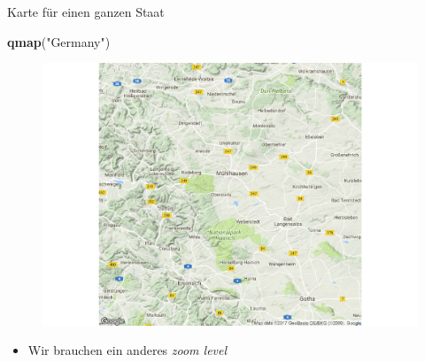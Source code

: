 \documentclass[ignorenonframetext,]{beamer}
\newenvironment{Shaded}{}{}
\newcommand{\KeywordTok}[1]{\textcolor[rgb]{0.00,0.44,0.13}{\textbf{{#1}}}}
\newcommand{\StringTok}[1]{\textcolor[rgb]{0.25,0.44,0.63}{{#1}}}
\newcommand{\NormalTok}[1]{{#1}}
\providecommand{\tightlist}{%
\setlength{\itemsep}{0pt}\setlength{\parskip}{0pt}}
\begin{document}
\begin{frame}[fragile]{Karte für einen ganzen Staat}

\begin{Shaded}
\begin{Highlighting}[]
\KeywordTok{qmap}\NormalTok{(}\StringTok{"Germany"}\NormalTok{)}
\end{Highlighting}
\end{Shaded}

\begin{figure}[htbp]
\centering
\includegraphics{RSocialScience2_files/figure-beamer/unnamed-chunk-29-1.pdf}
\caption{}
\end{figure}

\begin{itemize}
\tightlist
\item
  Wir brauchen ein anderes \emph{zoom level}
\end{itemize}

\end{frame}
\end{document}
